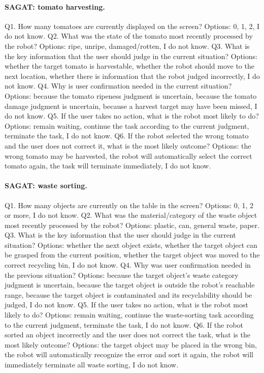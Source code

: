 \paragraph{SAGAT: tomato harvesting.}
Q1. How many tomatoes are currently displayed on the screen? Options: 0, 1, 2, I do not know.
Q2. What was the state of the tomato most recently processed by the robot? Options: ripe, unripe, damaged/rotten, I do not know.
Q3. What is the key information that the user should judge in the current situation? Options: whether the target tomato is harvestable, whether the robot should move to the next location, whether there is information that the robot judged incorrectly, I do not know.
Q4. Why is user confirmation needed in the current situation? Options: because the tomato ripeness judgment is uncertain, because the tomato damage judgment is uncertain, because a harvest target may have been missed, I do not know.
Q5. If the user takes no action, what is the robot most likely to do? Options: remain waiting, continue the task according to the current judgment, terminate the task, I do not know.
Q6. If the robot selected the wrong tomato and the user does not correct it, what is the most likely outcome? Options: the wrong tomato may be harvested, the robot will automatically select the correct tomato again, the task will terminate immediately, I do not know.

\paragraph{SAGAT: waste sorting.}
Q1. How many objects are currently on the table in the screen? Options: 0, 1, 2 or more, I do not know.
Q2. What was the material/category of the waste object most recently processed by the robot? Options: plastic, can, general waste, paper.
Q3. What is the key information that the user should judge in the current situation? Options: whether the next object exists, whether the target object can be grasped from the current position, whether the target object was moved to the correct recycling bin, I do not know.
Q4. Why was user confirmation needed in the previous situation? Options: because the target object's waste category judgment is uncertain, because the target object is outside the robot's reachable range, because the target object is contaminated and its recyclability should be judged, I do not know.
Q5. If the user takes no action, what is the robot most likely to do? Options: remain waiting, continue the waste-sorting task according to the current judgment, terminate the task, I do not know.
Q6. If the robot sorted an object incorrectly and the user does not correct the task, what is the most likely outcome? Options: the target object may be placed in the wrong bin, the robot will automatically recognize the error and sort it again, the robot will immediately terminate all waste sorting, I do not know.

